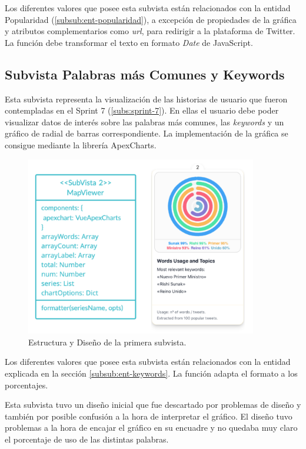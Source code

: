 Los diferentes valores que posee esta subvista están relacionados con la entidad Popularidad (\ref{subsub:ent-popularidad}), a excepción de propiedades de la gráfica y atributos complementarios como \textit{url}, para redirigir a la plataforma de Twitter. La función debe transformar el texto en formato \textit{Date} de JavaScript.

\subsection{Subvista Palabras más Comunes y Keywords}
Esta subvista representa la visualización de las historias de usuario que fueron contempladas en el Sprint 7 (\ref{subs:sprint-7}). En ellas el usuario debe poder visualizar datos de interés sobre las palabras más comunes, las \textit{keywords} y un gráfico de radial de barras correspondiente. La implementación de la gráfica se consigue mediante la librería ApexCharts.

\begin{figure}[H]
    \centering
    \myfloatalign
    \includegraphics[width=0.9\textwidth]{gfx/subvista2.png}
    \caption[Estructura y Diseño de la segunda subvista]{Estructura y Diseño de la primera subvista.}\label{gfx:subvista2}
\end{figure}

Los diferentes valores que posee esta subvista están relacionados con la entidad explicada en la sección \ref{subsub:ent-keywords}. La función adapta el formato a los porcentajes.

\vspace{0.3cm}

Esta subvista tuvo un diseño inicial que fue descartado por problemas de diseño y también por posible confusión a la hora de interpretar el gráfico. El diseño tuvo problemas a la hora de encajar el gráfico en su encuadre y no quedaba muy claro el porcentaje de uso de las distintas palabras.

